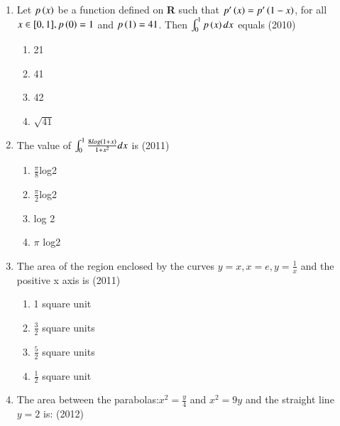 \documentclass[journal,12pt,twocolumn]{IEEEtran}
\theoremstyle{remark}
\begin{document}
\begin{enumerate}[label=\textcolor{black}{\arabic*.}]
	\item Let $p\left(x\right)$ be a function defined on \textbf{R} such that $p'\left(x\right)=p'\left(1-x\right)$, for all $x\in[0,1],p\left(0\right)=1$ and $p\left(1\right)=41$. Then $\int_0^1p\left(x\right)dx$ equals
		\hfill{(2010)}

		\begin{multicols}{4}
			\begin{enumerate}[label=(\alph*)]
				\item 21
				\item 41
				\item 42
				\item $\sqrt{41}$
			\end{enumerate}
		\end{multicols}


	\item The value of $\int_0^1\frac{8log\left(1+x\right)}{1+x^2}dx$ is
		\hfill{(2011)}

		\begin{multicols}{2}
			\begin{enumerate}[label=(\alph*)]
				\item $\frac{\pi}{8}$log2
				\item $\frac{\pi}{2}$log2
				\item log 2
				\item $\pi$ log2
			\end{enumerate}
		\end{multicols}


	\item The area of the region enclosed by the curves $y=x, x=e, y=\frac{1}{x}$ and the positive x axis is
		\hfill{(2011)}

		\begin{multicols}{2}
			\begin{enumerate}[label=(\alph*)]
				\item 1 square unit
				\item $\frac{3}{2}$ square units
				\item $\frac{5}{2}$ square units
				\item $\frac{1}{2}$ square unit
			\end{enumerate}
		\end{multicols}


	\item The area between the parabolas:$x^2=\frac{y}{4}$ and $x^2=9y$ and the straight line $y=2$ is:
		\hfill{(2012)}


\end{enumerate}
\end{document}
